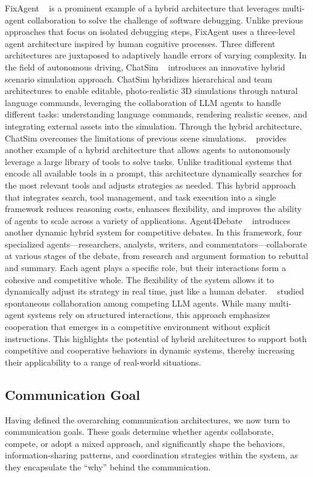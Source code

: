 FixAgent ~\cite{fixagent_mas_for_debug} is a prominent example of a hybrid architecture that leverages multi-agent collaboration to solve the challenge of software debugging. Unlike previous approaches that focus on isolated debugging steps, FixAgent uses a three-level agent architecture inspired by human cognitive processes. Three different architectures are juxtaposed to adaptively handle errors of varying complexity.
In the field of autonomous driving, ChatSim ~\cite{chatsim_mas_make_scene} introduces an innovative hybrid scenario simulation approach. ChatSim hybridizes hierarchical and team architectures to enable editable, photo-realistic 3D simulations through natural language commands, leveraging the collaboration of LLM agents to handle different tasks: understanding language commands, rendering realistic scenes, and integrating external assets into the simulation. Through the hybrid architecture, ChatSim overcomes the limitations of previous scene simulations.
~\cite{mas_use_tool} provides another example of a hybrid architecture that allows agents to autonomously leverage a large library of tools to solve tasks. Unlike traditional systems that encode all available tools in a prompt, this architecture dynamically searches for the most relevant tools and adjusts strategies as needed. This hybrid approach that integrates search, tool management, and task execution into a single framework reduces reasoning costs, enhances flexibility, and improves the ability of agents to scale across a variety of applications.
Agent4Debate ~\cite{agent4debate} introduces another dynamic hybrid system for competitive debates. In this framework, four specialized agents—researchers, analysts, writers, and commentators—collaborate at various stages of the debate, from research and argument formation to rebuttal and summary. Each agent plays a specific role, but their interactions form a cohesive and competitive whole. The flexibility of the system allows it to dynamically adjust its strategy in real time, just like a human debater.
~\cite{shallwetalk} studied spontaneous collaboration among competing LLM agents. While many multi-agent systems rely on structured interactions, this approach emphasizes cooperation that emerges in a competitive environment without explicit instructions. This highlights the potential of hybrid architectures to support both competitive and cooperative behaviors in dynamic systems, thereby increasing their applicability to a range of real-world situations.

\subsection{Communication Goal}
Having defined the overarching communication architectures, we now turn to communication goals. These goals determine whether agents collaborate, compete, or adopt a mixed approach, and significantly shape the behaviors, information-sharing patterns, and coordination strategies within the system, as they encapsulate the “why” behind the communication.

